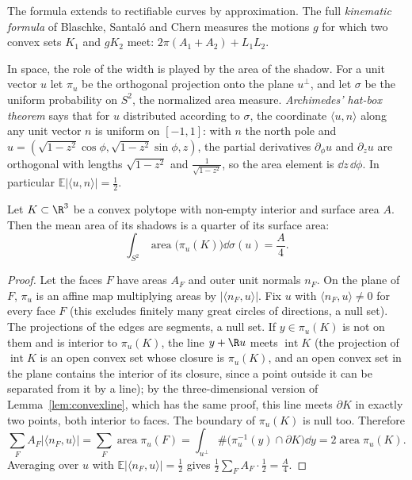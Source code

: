 The formula extends to rectifiable curves by approximation. The full \emph{kinematic formula} of Blaschke, Santaló and Chern measures the motions
$g$ for which two convex sets $K_1$ and $gK_2$ meet: $2\pi(A_1+A_2)+L_1L_2$.

In space, the role of the width is played by the area of the shadow. For a unit vector $u$ let $\pi_u$ be the orthogonal projection onto the plane $u^\perp$, and let $\sigma$ be the uniform probability on $S^2$, the normalized
area measure. \emph{Archimedes' hat-box theorem} says that for $u$ distributed according to $\sigma$, the coordinate $\langle u,n\rangle$ along any unit vector $n$ is uniform on $[-1,1]$: with $n$ the north pole and
$u=(\sqrt{1-z^2}\cos\phi,\sqrt{1-z^2}\sin\phi,z)$, the partial derivatives $\partial_\phi u$ and $\partial_zu$ are orthogonal with lengths $\sqrt{1-z^2}$ and $\frac1{\sqrt{1-z^2}}$, so the area element is $\dd z\,\dd\phi$. In particular
$\mathbb E|\langle u,n\rangle|=\frac12$.

\begin{theorem}\label{thm:cauchyspace}
Let $K\subset\R^3$ be a convex polytope with non-empty interior and surface area $A$. Then the mean area of its shadows is a quarter of its surface area:
\[\int_{S^2}\operatorname{area}\bigl(\pi_u(K)\bigr)\dd\sigma(u)=\frac A4.\]
\end{theorem}

\begin{proof}
Let the faces $F$ have areas $A_F$ and outer unit normals $n_F$. On the plane of $F$, $\pi_u$ is an affine map multiplying areas by $|\langle n_F,u\rangle|$. Fix $u$ with $\langle n_F,u\rangle\neq0$ for every face $F$ (this excludes finitely many great circles of directions, a null set). The projections of the edges are segments, a null set. If $y\in\pi_u(K)$ is not on them and is interior to $\pi_u(K)$, the line $y+\R u$ meets $\operatorname{int}K$ (the projection of $\operatorname{int}K$ is an
open convex set whose closure is $\pi_u(K)$, and an open convex set in the plane contains the interior of its closure, since a point outside it can be separated from it by a line); by the three-dimensional version of
Lemma~\ref{lem:convexline}, which has the same proof, this line meets $\partial K$ in exactly two points, both interior to faces. The boundary of $\pi_u(K)$ is null too. Therefore
\[\sum_FA_F|\langle n_F,u\rangle|=\sum_F\operatorname{area}\pi_u(F)=\int_{u^\perp}\#\bigl(\pi_u^{-1}(y)\cap\partial K\bigr)\dd y=2\operatorname{area}\pi_u(K).\]
Averaging over $u$ with $\mathbb E|\langle n_F,u\rangle|=\frac12$ gives $\frac12\sum_FA_F\cdot\frac12=\frac A4$.
\end{proof}

